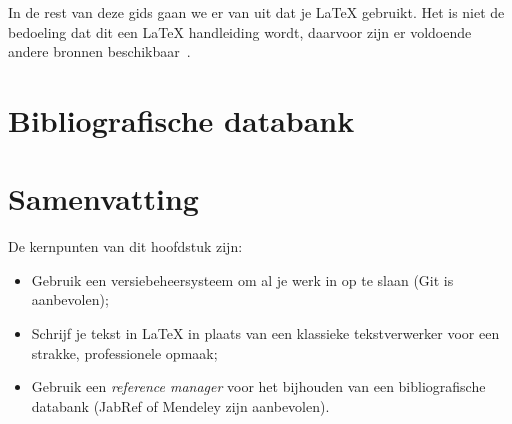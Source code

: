 

In de rest van deze gids gaan we er van uit dat je {\LaTeX} gebruikt. Het is niet de bedoeling dat dit een {\LaTeX} handleiding wordt, daarvoor zijn er voldoende andere bronnen beschikbaar~\autocite{Oetiker2015}.

\section{Bibliografische databank}
\label{sec:bibliografische-databank}

\section{Samenvatting}
\label{sec:voorbereiding-samenvatting}

De kernpunten van dit hoofdstuk zijn:

\begin{itemize}
  \item Gebruik een versiebeheersysteem om al je werk in op te slaan (Git is aanbevolen);
  \item Schrijf je tekst in {\LaTeX} in plaats van een klassieke tekstverwerker voor een strakke, professionele opmaak;
  \item Gebruik een \emph{reference manager} voor het bijhouden van een bibliografische databank (JabRef of Mendeley zijn aanbevolen).
\end{itemize}
